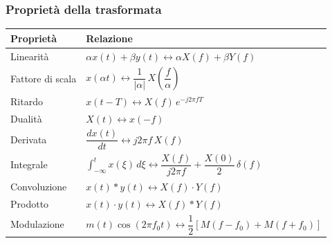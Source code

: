 \documentclass[12pt, a4paper]{article}
\begin{document}
\subsubsection{Proprietà della trasformata}
\begin{center}
\renewcommand{\arraystretch}{1.7}
\begin{tabular}{ll}
\toprule
\textbf{Proprietà} & \textbf{Relazione} \\
\midrule
Linearità & $\alpha x(t)+\beta y(t)\longleftrightarrow\alpha X(f)+\beta Y(f)$ \\
Fattore di scala & $x(\alpha t)\longleftrightarrow\dfrac{1}{|\alpha|}\,X\!\left(\dfrac f\alpha\right)$ \\
Ritardo & $x(t-T)\longleftrightarrow X(f)\,e^{-j2\pi fT}$ \\
Dualità & $X(t)\longleftrightarrow x(-f)$ \\
Derivata & $\dfrac{dx(t)}{dt}\longleftrightarrow j2\pi f\,X(f)$ \\
Integrale & $\displaystyle\int_{-\infty}^{t}x(\xi)\,d\xi\longleftrightarrow\dfrac{X(f)}{j2\pi f}+\dfrac{X(0)}{2}\,\delta(f)$ \\
Convoluzione & $x(t)*y(t)\longleftrightarrow X(f)\cdot Y(f)$ \\
Prodotto & $x(t)\cdot y(t)\longleftrightarrow X(f)*Y(f)$ \\
Modulazione & $m(t)\cos(2\pi f_0t)\longleftrightarrow\dfrac12\left[M(f-f_0)+M(f+f_0)\right]$ \\
\bottomrule
\end{tabular}
\end{center}
\end{document}
